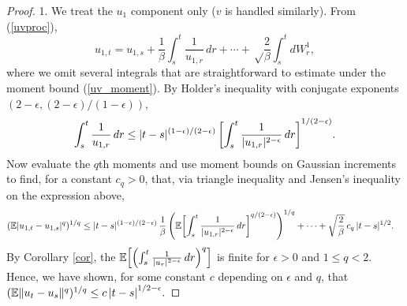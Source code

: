 \documentclass[11pt, twoside]{report}
\begin{document}
\begin{proof}   
 1. We treat the $u_1$ component only ($v$ is handled similarly). From (\ref{uvproc}),
\[
u_{1,t}=u_{1,s}+\frac 1\beta\int_s^t \frac{1}{ u_{1,r}}\,dr + \cdots+ \sqrt\frac{2}\beta\int_s^t dW^1_r,
\]
where we omit several integrals that are straightforward to estimate under the moment bound (\ref{uv_moment}). By Holder's inequality with conjugate exponents $(2-\epsilon, (2-\epsilon)/(1-\epsilon))$,
\[
\int_s^t \frac{1}{ u_{1,r}}\,dr 
\le |t-s|^{(1-\epsilon)/(2-\epsilon)}\,  {\left[\int_s^t\frac{1}{|u_{1,r}|^{2-\epsilon}} \,dr\right]^{1/(2-\epsilon)}}.
\]
Now evaluate the $q$th moments and use moment bounds on Gaussian increments to find, for a constant $c_q>0$, that, via triangle inequality and Jensen's inequality on the expression above,
\begin{align*}
(\mathbb E |u_{1,t}-u_{1,s}|^q)^{1/q}
&\le |t-s|^{(1-\epsilon)/(2-\epsilon)}\,\frac 1\beta\,  \pp{\mathbb{E} \bp{\int_s^t\frac{1}{|u_{1,r}|^{2-\epsilon}} \,dr}^{q/(2-\epsilon)}}^{1/q} + \cdots+\sqrt{\frac 2\beta}\,c_q\,|t-s|^{1/2}.
\end{align*}
By Corollary \ref{cor}, the $\mathbb{E} \bp{\pp{\int_s^t\frac{1}{|u_r|^{2-\epsilon}} \,dr}^q}$ is finite for $\epsilon>0$ and $1 \le q < 2$. Hence, we have shown, for some constant $c$ depending on $\epsilon$ and $q$, that
$(\mathbb E \|u_t-u_s\|^q)^{1/q}\le c\,\abs{t-s}^{1/2-\epsilon}.
$



\end{proof}
\end{document}

